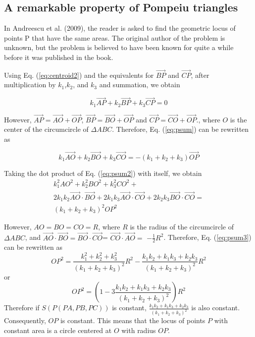 \documentclass[12pt]{article}
\begin{document}
\subsection{A remarkable property of Pompeiu triangles}
In Andreescu et al. (2009), the reader is asked to find the geometric locus of points P that have the same areas. The original author of the problem is unknown, but the problem is believed to have been known for quite a while before it was published in the book. 

Using Eq. (\ref{eq:centroid2}) and the equivalents for $\vec{BP}$ and $\vec{CP}$, after multiplication by $k_1$,$k_2$, and $k_3$ and summation, we obtain

\begin{equation}
k_1\vec{AP}+k_2\vec{BP}+k_3\vec{CP}=0
\label{eq:psum}
\end{equation}

However, $\vec{AP}=\vec{AO}+\vec{OP}$, $\vec{BP}=\vec{BO}+\vec{OP}$ and $\vec{CP}=\vec{CO}+\vec{OP}.$, where $O$ is the center of the circumcircle of $\Delta ABC$. Therefore, Eq. (\ref{eq:psum}) can be rewritten as

\begin{equation}
k_1\vec{AO}+k_2\vec{BO}+k_3\vec{CO}=-(k_1+k_2+k_3)\vec{OP}
\label{eq:psum2}
\end{equation}

Taking the dot product of Eq. (\ref{eq:psum2}) with itself, we obtain
\begin{equation}
\begin{split}
k_1^2 AO^2+k_2^2 BO^2 +k_3^2 CO^2+\\
2k_1k_2\vec{AO}\cdot\vec{BO}+2k_1k_3\vec{AO}\cdot\vec{CO}+2k_2k_3\vec{BO}\cdot\vec{CO}=\\
(k_1+k_2+k_3)^2 OP^2
\end{split}
\label{eq:psum3}
\end{equation}

However, $AO=BO=CO=R$, where $R$ is the radius of the circumcircle of $\Delta ABC$, and 
$\vec{AO}\cdot\vec{BO}=\vec{BO}\cdot\vec{CO}$=
$\vec{CO}\cdot\vec{AO}=$
$-\frac{1}{2}R^2$. Therefore, Eq. (\ref{eq:psum3}) can be rewritten as
\begin{equation}
OP^2=\frac{k_1^2+k_2^2+k_3^2}{(k_1+k_2+k_3)^2}R^2-\frac{k_1k_2+k_1k_3+k_2k_3}{(k_1+k_2+k_3)^2}R^2
\label{eq:psum4}
\end{equation}
or
\begin{equation}
    OP^2=\left(1-3\frac{k_1k_2+k_1k_3+k_2k_3}{(k_1+k_2+k_3)^2}\right) R^2
    \label{eq:psum5}
\end{equation}
Therefore if $S(P(PA,PB,PC))$ is constant, $\frac{k_1k_2+k_1k_3+k_2k_3}{(k_1+k_2+k_3)^2}$ is also constant. Consequently, $OP$ is constant.  This means that the locus of points $P$ with constant area is a circle centered at $O$ with radius $OP$.
\end{document}
